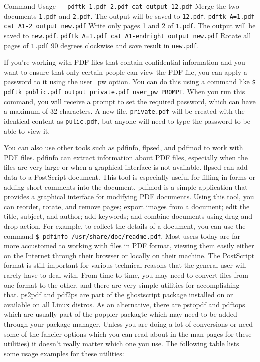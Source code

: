 Command \textbar{} Usage - \textbar{} -
\texttt{pdftk 1.pdf 2.pdf cat output 12.pdf} \textbar{} Merge the two
documents \texttt{1.pdf} and \texttt{2.pdf}. The output will be saved to
\texttt{12.pdf}. \texttt{pdftk A=1.pdf cat A1-2 output new.pdf}
\textbar{} Write only pages 1 and 2 of \texttt{1.pdf}. The output will
be saved to \texttt{new.pdf}.
\texttt{pdftk A=1.pdf cat A1-endright output new.pdf} \textbar{} Rotate
all pages of \texttt{1.pdf} 90 degrees clockwise and save result in
\texttt{new.pdf}.

If you're working with PDF files that contain confidential information
and you want to ensure that only certain people can view the PDF file,
you can apply a password to it using the user\_pw option. You can do
this using a command like
\texttt{\$ pdftk public.pdf output private.pdf user\_pw PROMPT}. When
you run this command, you will receive a prompt to set the required
password, which can have a maximum of 32 characters. A new file,
\texttt{private.pdf} will be created with the identical content as
\texttt{pulic.pdf}, but anyone will need to type the password to be able
to view it.

You can also use other tools such as pdfinfo, flpsed, and pdfmod to work
with PDF files. pdfinfo can extract information about PDF files,
especially when the files are very large or when a graphical interface
is not available. flpsed can add data to a PostScript document. This
tool is especially useful for filling in forms or adding short comments
into the document. pdfmod is a simple application that provides a
graphical interface for modifying PDF documents. Using this tool, you
can reorder, rotate, and remove pages; export images from a document;
edit the title, subject, and author; add keywords; and combine documents
using drag-and-drop action. For example, to collect the details of a
document, you can use the command
\texttt{\$ pdfinfo /usr/share/doc/readme.pdf}. Most users today are far
more accustomed to working with files in PDF format, viewing them easily
either on the Internet through their browser or locally on their
machine. The PostScript format is still important for various technical
reasons that the general user will rarely have to deal with. From time
to time, you may need to convert files from one format to the other, and
there are very simple utilities for accomplishing that. ps2pdf and
pdf2ps are part of the ghostscript package installed on or available on
all Linux distros. As an alternative, there are pstopdf and pdftops
which are usually part of the poppler packagte which may need to be
added through your package manager. Unless you are doing a lot of
conversions or need some of the fancier options which you can read about
in the man pages for these utilities) it doesn't really matter which one
you use. The following table lists some usage examples for these
utilities:


